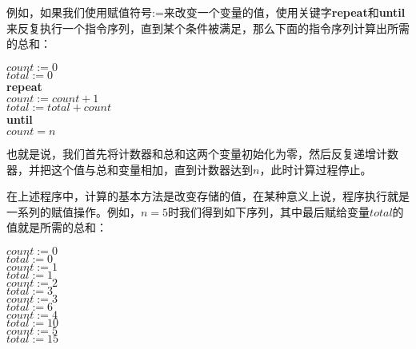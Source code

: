 例如，如果我们使用赋值符号:=来改变一个变量的值，使用关键字\textbf{repeat}和\textbf{until}来反复执行一个指令序列，直到某个条件被满足，那么下面的指令序列计算出所需的总和：

\noindent\hspace*{1cm} $count := 0$\\
\hspace*{1cm} $total := 0$\\
\hspace*{1cm} \textbf{repeat}\\
\hspace*{1cm} \quad $count := count + 1$\\
\hspace*{1cm} \quad $total := total + count$\\
\hspace*{1cm} \textbf{until}\\
\hspace*{1cm} \quad $count = n$

也就是说，我们首先将计数器和总和这两个变量初始化为零，然后反复递增计数器，并把这个值与总和变量相加，直到计数器达到$n$，此时计算过程停止。

在上述程序中，计算的基本方法是改变存储的值，在某种意义上说，程序执行就是一系列的赋值操作。例如，$n
= 5$时我们得到如下序列，其中最后赋给变量$total$的值就是所需的总和：

\noindent\hspace*{1cm} $count := 0$\\ 
\hspace*{1cm} $total := 0$\\
\hspace*{1cm} $count := 1$\\
\hspace*{1cm} $total := 1$\\
\hspace*{1cm} $count := 2$\\
\hspace*{1cm} $total := 3$\\
\hspace*{1cm} $count := 3$\\
\hspace*{1cm} $total := 6$\\
\hspace*{1cm} $count := 4$\\
\hspace*{1cm} $total := 10$\\
\hspace*{1cm} $count := 5$\\
\hspace*{1cm} $total := 15$\\

